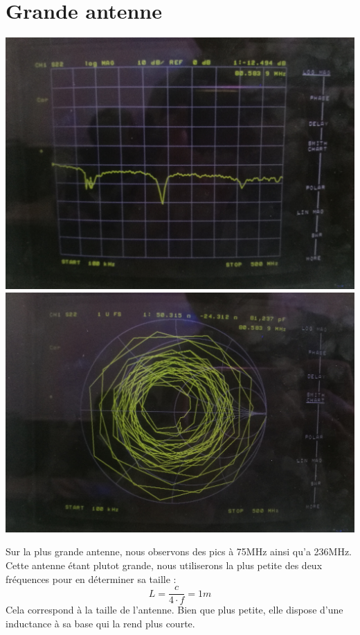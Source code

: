 \documentclass[a4paper,12pt]{report}            %
\begin{document}
\newpage

\section{Grande antenne}

\begin{center}
	\includegraphics[scale = 0.062]{pic/S_grande.jpg}
	\includegraphics[scale = 0.065]{pic/Smith_grande.jpg} 
\end{center}

Sur la plus grande antenne, nous observons des pics à 75MHz ainsi qu'a 236MHz. Cette antenne étant plutot grande,
nous utiliserons la plus petite des deux fréquences pour en déterminer sa taille :
$$ L = \frac{c}{4\cdot f} = 1m$$
Cela correspond à la taille de l'antenne. Bien que plus petite, elle dispose d'une inductance à sa base qui
la rend plus courte.
\end{document}

